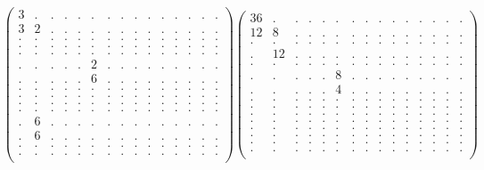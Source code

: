 \documentclass[12pt,a4paper]{amsart}
\begin{document}
\begin{align*}
\left(\begin{array}{rrrrrrrrrrrrrrr}%
3&.&.&.&.&.&.&.&.&.&.&.&.&.&.\\%
3&2&.&.&.&.&.&.&.&.&.&.&.&.&.\\%
.&.&.&.&.&.&.&.&.&.&.&.&.&.&.\\%
.&.&.&.&.&.&.&.&.&.&.&.&.&.&.\\%
.&.&.&.&.&.&.&.&.&.&.&.&.&.&.\\%
.&.&.&.&.&2&.&.&.&.&.&.&.&.&.\\%
.&.&.&.&.&6&.&.&.&.&.&.&.&.&.\\%
.&.&.&.&.&.&.&.&.&.&.&.&.&.&.\\%
.&.&.&.&.&.&.&.&.&.&.&.&.&.&.\\%
.&.&.&.&.&.&.&.&.&.&.&.&.&.&.\\%
.&.&.&.&.&.&.&.&.&.&.&.&.&.&.\\%
.&6&.&.&.&.&.&.&.&.&.&.&.&.&.\\%
.&6&.&.&.&.&.&.&.&.&.&.&.&.&.\\%
.&.&.&.&.&.&.&.&.&.&.&.&.&.&.\\%
.&.&.&.&.&.&.&.&.&.&.&.&.&.&.\\%
\end{array}\right)%
\left(\begin{array}{rrrrrrrrrrrrrrr}%
36&.&.&.&.&.&.&.&.&.&.&.&.&.&.\\%
12&8&.&.&.&.&.&.&.&.&.&.&.&.&.\\%
.&.&.&.&.&.&.&.&.&.&.&.&.&.&.\\%
.&12&.&.&.&.&.&.&.&.&.&.&.&.&.\\%
.&.&.&.&.&.&.&.&.&.&.&.&.&.&.\\%
.&.&.&.&.&8&.&.&.&.&.&.&.&.&.\\%
.&.&.&.&.&4&.&.&.&.&.&.&.&.&.\\%
.&.&.&.&.&.&.&.&.&.&.&.&.&.&.\\%
.&.&.&.&.&.&.&.&.&.&.&.&.&.&.\\%
.&.&.&.&.&.&.&.&.&.&.&.&.&.&.\\%
.&.&.&.&.&.&.&.&.&.&.&.&.&.&.\\%
.&.&.&.&.&.&.&.&.&.&.&.&.&.&.\\%
.&.&.&.&.&.&.&.&.&.&.&.&.&.&.\\%
.&.&.&.&.&.&.&.&.&.&.&.&.&.&.\\%
.&.&.&.&.&.&.&.&.&.&.&.&.&.&.\\%
\end{array}\right)%
\end{align*}
\end{document}
